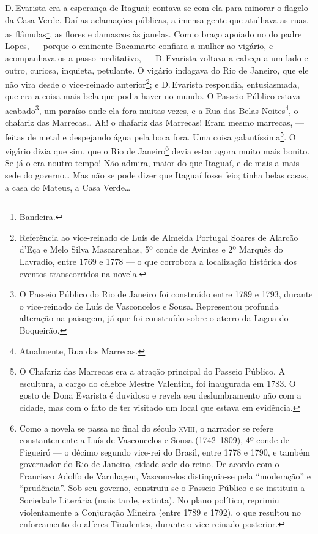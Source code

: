 D.\,Evarista era a esperança de Itaguaí; contava-se com ela para minorar
o flagelo da Casa Verde. Daí as aclamações públicas, a imensa gente que
atulhava as ruas, as flâmulas\footnote{Bandeira.}, as flores e damascos
às janelas. Com o braço apoiado no do padre Lopes, --- porque o eminente
Bacamarte confiara a mulher ao vigário, e acompanhava-os a passo
meditativo, --- D.\,Evarista voltava a cabeça a um lado e outro, curiosa,
inquieta, petulante. O vigário indagava do Rio de Janeiro, que ele não
vira desde o vice-reinado anterior\footnote{Referência ao vice-reinado
  de Luís de Almeida Portugal Soares de Alarcão d'Eça e Melo Silva
  Mascarenhas, 5º conde de Avintes e 2º Marquês do Lavradio, entre 1769
  e 1778 --- o que corrobora a localização histórica dos eventos
  transcorridos na novela.}; e D.\,Evarista respondia, entusiasmada, que
era a coisa mais bela que podia haver no mundo. O Passeio Público estava
acabado\footnote{O Passeio Público do Rio de Janeiro foi construído
  entre 1789 e 1793, durante o vice-reinado de Luís de Vasconcelos e
  Sousa. Representou profunda alteração na paisagem, já que foi
  construído sobre o aterro da Lagoa do Boqueirão.}, um paraíso onde ela
fora muitas vezes, e a Rua das Belas Noites\footnote{Atualmente, Rua das
  Marrecas.}, o chafariz das Marrecas\ldots{} Ah! o chafariz das
Marrecas! Eram mesmo marrecas, --- feitas de metal e despejando água
pela boca fora. Uma coisa galantíssima\footnote{O Chafariz das Marrecas
  era a atração principal do Passeio Público. A escultura, a cargo do
  célebre Mestre Valentim, foi inaugurada em 1783. O gosto de Dona
  Evarista é duvidoso e revela seu deslumbramento não com a cidade, mas
  com o fato de ter visitado um local que estava em evidência.}. O
vigário dizia que sim, que o Rio de Janeiro\footnote{Como a novela se
  passa no final do século \textsc{xviii}, o narrador se refere constantemente a
  Luís de Vasconcelos e Sousa (1742--1809), 4º conde de Figueiró --- o
  décimo segundo vice-rei do Brasil, entre 1778 e 1790, e também
  governador do Rio de Janeiro, cidade-sede do reino. De acordo com o
  Francisco Adolfo de Varnhagen, Vasconcelos distinguia-se pela
  ``moderação'' e ``prudência''. Sob seu governo, construiu-se o Passeio
  Público e se instituiu a Sociedade Literária (mais tarde, extinta). No
  plano político, reprimiu violentamente a Conjuração Mineira (entre
  1789 e 1792), o que resultou no enforcamento do alferes Tiradentes,
  durante o vice-reinado posterior.} devia estar agora muito mais
bonito. Se já o era noutro tempo! Não admira, maior do que Itaguaí, e de
mais a mais sede do governo\ldots{} Mas não se pode dizer que Itaguaí
fosse feio; tinha belas casas, a casa do Mateus, a Casa Verde\ldots{}


